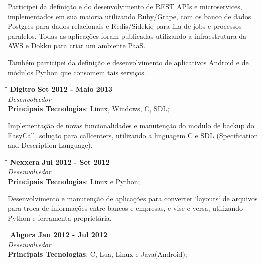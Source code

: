 \documentclass[margin]{res}
\begin{document}
\begin{resume}
Participei da definição e do desenvolvimento de REST APIs e microservices, implementados em sua maioria utilizando Ruby/Grape, com os banco de dados Postgres para dados relacionais e Redis/Sidekiq para fila de jobs e processos paralelos. Todas as aplicações foram publicadas utilizando a infraestrutura da AWS e Dokku para criar um ambiente PaaS.

Também participei da definição e desenvolvimento de aplicativos Android e de módulos Python que consomem tais serviços.


\vspace{-0.1in}
   \begin{tabbing}
   \hspace{2.3in}\= \hspace{1.7in}\= \kill %
    \textbf{Digitro}    \>\>\textbf{Set 2012 - Maio 2013}\\
    \textit{Desenvolvedor}\\
    \textbf{Principais Tecnologias}: Linux, Windows, C, SDL;
   \end{tabbing}\vspace{-20pt}      %
    \vspace{2mm}
    
    Implementação de novas funcionalidades e manutenção do modulo de backup do EasyCall, solução para callcenters, utilizando a linguagem C e SDL (Specification and Description Language).

   \begin{tabbing}
   \hspace{2.3in}\= \hspace{1.7in}\= \kill %
    \textbf{Nexxera}    \>\>\textbf{Jul 2012 - Set 2012}\\
    \textit{Desenvolvedor}\\
    \textbf{Principais Tecnologias}: Linux e Python;
   \end{tabbing}\vspace{-20pt}      %
    \vspace{2mm}
    Desenvolvimento e manutenção de aplicações para converter `layouts` de arquivos para troca de informações entre bancos e empresas, e vise e versa, utilizando Python e ferramenta proprietária.

   \begin{tabbing}
   \hspace{2.3in}\= \hspace{1.5in}\= \kill %
    \textbf{Ahgora}    \>\>\textbf{Jan 2012 - Jul 2012}\\
    \textit{Desenvolvedor}\\
    \textbf{Principais Tecnologias}: C, Lua, Linux e Java(Android);
   \end{tabbing}\vspace{-20pt}      %
    \vspace{2mm}
    

\end{resume}
\end{document}

